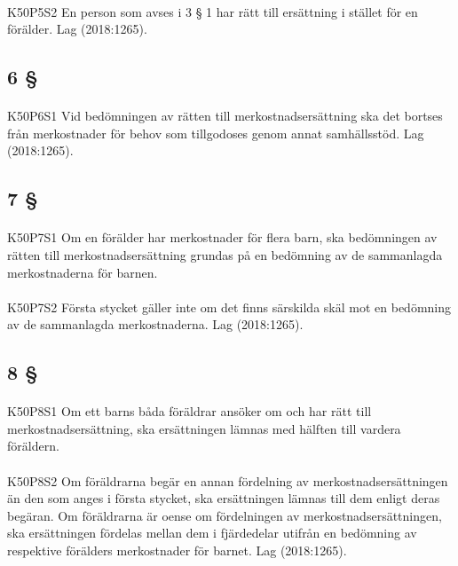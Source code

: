\documentclass[a4paper,notitlepage,openany,10pt]{book}
\begin{document}
\paragraph*{}
{\tiny K50P5S2}
En person som avses i 3 § 1 har rätt till ersättning i stället för en förälder.
Lag (2018:1265).
\subsection*{6 §}
\paragraph*{}
{\tiny K50P6S1}
Vid bedömningen av rätten till merkostnadsersättning ska det bortses från merkostnader för behov som tillgodoses genom annat samhällsstöd.
Lag (2018:1265).
\subsection*{7 §}
\paragraph*{}
{\tiny K50P7S1}
Om en förälder har merkostnader för flera barn, ska bedömningen av rätten till merkostnadsersättning grundas på en bedömning av de sammanlagda merkostnaderna för barnen.
\paragraph*{}
{\tiny K50P7S2}
Första stycket gäller inte om det finns särskilda skäl mot en bedömning av de sammanlagda merkostnaderna.
Lag (2018:1265).
\subsection*{8 §}
\paragraph*{}
{\tiny K50P8S1}
Om ett barns båda föräldrar ansöker om och har rätt till merkostnadsersättning, ska ersättningen lämnas med hälften till vardera föräldern.
\paragraph*{}
{\tiny K50P8S2}
Om föräldrarna begär en annan fördelning av merkostnadsersättningen än den som anges i första stycket, ska ersättningen lämnas till dem enligt deras begäran. Om föräldrarna är oense om fördelningen av merkostnadsersättningen, ska ersättningen fördelas mellan dem i fjärdedelar utifrån en bedömning av respektive förälders merkostnader för barnet.
Lag (2018:1265).
\end{document}
